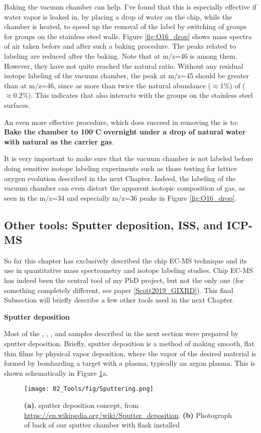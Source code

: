 Baking the vacuum chamber can help. I've found that this is especially effective if water vapor is leaked in, by placing a drop of water on the chip, while the chamber is heated, to speed up the removal of the  label by switching of  groups for  groups on the stainless steel walls. Figure \ref{fig:O16_drop} shows mass spectra of air taken before and after such a baking procedure. The peaks related to  labeling are reduced after the baking. Note that  at m/z=46 is among them. However, they have not quite reached the natural ratio. Without any residual isotope labeling of the vacuum chamber, the peak at m/z=45 should be greater than at m/z=46, since  as more than twice the natural abundance ($\approx 1$\%) of  ($\approx 0.2$\%). This indicates that  also interacts with the  groups on the stainless steel surfaces. 

An even more effective procedure, which does succeed in removing the  is to: \textbf{Bake the chamber to 100$^\circ$C overnight under a drop of natural water with natural  as the carrier gas}. 

It is very important to make sure that the vacuum chamber is not labeled before doing sensitive isotope labeling experiments such as those testing for lattice oxygen evolution described in the next Chapter. Indeed, the labeling of the vacuum chamber can even distort the apparent isotopic composition of  gas, as seen in the m/z=34 and especially m/z=36 peaks in Figure \ref{fig:O16_drop}.

\subsection{Other tools: Sputter deposition, ISS, and ICP-MS}\label{subsec:other_tools}

So far this chapter has exclusively described the chip EC-MS technique and its use in quantitative mass spectrometry and isotope labeling studies. Chip EC-MS has indeed been the central tool of my PhD project, but not the only one (for something completely different, see paper \ref{Scott2019_GIXRD}). This final Subsection will briefly describe a few other tools used in the next Chapter.

\vspace{5mm}
\textbf{Sputter deposition}

Most of the , , , and  samples described in the next section were prepared by sputter deposition. Briefly, sputter deposition is a method of making smooth, flat thin films by physical vapor deposition, where the vapor of the desired material is formed by bombarding a target with a plasma, typically an argon plasma. This is shown schematically in Figure \ref{fig:sputter}a. 
\begin{figure}[h!]
	\centering
	\texttt{[image: 02\_Tools/fig/Sputtering.png]}
	\caption{\textbf{(a)}, sputter deposition concept, from \url{https://en.wikipedia.org/wiki/Sputter_deposition}. \textbf{(b)} Photograph of back of our sputter chamber with  flask installed }
	\label{fig:sputter}
\end{figure}

